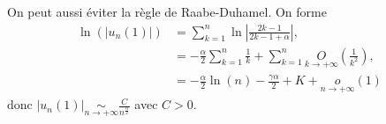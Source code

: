 \documentclass[12pt]{article}
\begin{document}
\begin{remark}
    On peut aussi éviter la règle de Raabe-Duhamel. On forme 
    \begin{align*}
        \ln\left(\left\lvert u_{n}(1)\right\rvert\right)
        &=
        \sum_{k=1}^{n}\ln\left\lvert\frac{2k-1}{2k-1+\alpha}\right\rvert,\\
        &=
        -\frac{\alpha}{2}\sum_{k=1}^{n}\frac{1}{k}+\sum_{k=1}^{n}\underset{k\to+\infty}{O}\left(\frac{1}{k^{2}}\right),\\
        &=-\frac{\alpha}{2}\ln(n)-\frac{\gamma\alpha}{2}+K+\underset{n\to+\infty}{o}\left(1\right)
    \end{align*}
    donc $\left\lvert u_{n}(1)\right\rvert\underset{n\to+\infty}{\sim}\frac{C}{n^{\frac{\alpha}{2}}}$ avec $C>0$.
\end{remark}
\end{document}
